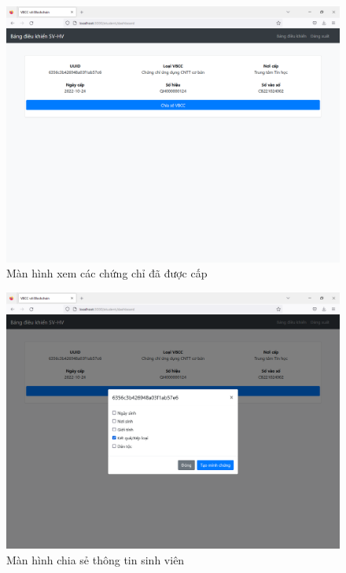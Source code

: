 \begin{figure}[htbp]
\centering
\includegraphics[width=.9\linewidth]{img/sv_hva.PNG}
\caption{Màn hình xem các chứng chỉ đã được cấp}
\label{fig:sv_hva}
\end{figure}

\begin{figure}[htbp]
\centering
\includegraphics[width=.9\linewidth]{img/sv_chiase.PNG}
\caption{Màn hình chia sẻ thông tin sinh viên}
\label{fig:sv_chiase}
\end{figure}

